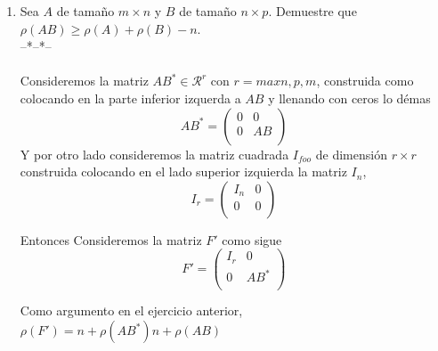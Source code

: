 \documentclass[letter]{memoir} %
\begin{document}
\begin{enumerate}
\item Sea $A$ de tamaño $m \times n$ y $B$ de tamaño $n\times p $. Demuestre que $\rho(AB) \geq \rho(A) + \rho(B) -n$. \\
--*--*--\\\\
Consideremos la matriz $AB^* \in \mathcal{R}^r$ con $r = max{n,p,m}$, construida como colocando en la parte inferior izquerda a $AB$ y llenando con ceros lo démas 
\[
AB^* = \left( \begin{array}{cc}
0 & 0 \\
0 & AB  \\ 
\end{array}
\right)
\]
 Y por otro lado consideremos la matriz cuadrada $I_{foo}$ de dimensión $r \times r$ construida colocando en el lado superior izquierda la matriz $I_n$,
\[
I_r = \left( \begin{array}{ccc}
I_n & 0 \\
0 & 0  \\ 
\end{array}
\right)
\]

Entonces Consideremos la matriz $F'$ como sigue
\[
F' = \left( \begin{array}{ccc}
I_r & 0 \\
0 & AB^*  \\ 
\end{array}
\right)
\]

Como argumento en el ejercicio anterior, $\rho(F') = n +\rho(AB^*) n +\rho(AB) $


\end{enumerate}
\end{document}
